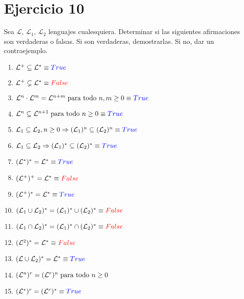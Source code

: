 \documentclass[12pt]{article}
\begin{document}
\section*{Ejercicio 10}
Sea $\mathcal{L}$, $\mathcal{L}_1$, $\mathcal{L}_2$ lenguajes cualesquiera. Determinar si las siguientes afirmaciones son verdaderas o falsas. Si son verdaderas, demostrarlas. Si no, dar un contraejemplo.
\begin{enumerate}[label=\Roman*.]
    \item $\mathcal{L}^+ \subseteq \mathcal{L}^* \equiv \textcolor{blue}{True}$
    \item $\mathcal{L}^+ \subsetneq \mathcal{L}^* \equiv \textcolor{red}{False}$
    \item $\mathcal{L}^n \cdot \mathcal{L}^m = \mathcal{L}^{n+m} \hspace{0.1cm} \text{para todo } n,m \geq 0 \equiv \textcolor{blue}{True}$
    \item $\mathcal{L}^n \subseteq \mathcal{L}^{n+1} \hspace{0.1cm} \text{para todo } n \geq 0\equiv \textcolor{blue}{True}$
    \item $\mathcal{L}_1 \subseteq \mathcal{L}_2, n \geq 0 \Rightarrow (\mathcal{L}_1)^n \subseteq (\mathcal{L}_2)^n \equiv \textcolor{blue}{True}$
    \item $\mathcal{L}_1 \subseteq \mathcal{L}_2 \Rightarrow (\mathcal{L}_1)^* \subseteq (\mathcal{L}_2)^* \equiv \textcolor{blue}{True}$
    \item $(\mathcal{L}^*)^* = \mathcal{L}^* \equiv \textcolor{blue}{True}$
    \item $(\mathcal{L}^+)^+ = \mathcal{L}^* \equiv \textcolor{red}{False}$
    \item $(\mathcal{L}^+)^* = \mathcal{L}^* \equiv \textcolor{blue}{True}$
    \item $(\mathcal{L}_1 \cup \mathcal{L}_2)^* = (\mathcal{L}_1)^* \cup (\mathcal{L}_2)^* \equiv \textcolor{red}{False}$
    \item $(\mathcal{L}_1 \cap \mathcal{L}_2)^* = (\mathcal{L}_1)^* \cap (\mathcal{L}_2)^* \equiv \textcolor{red}{False}$
    \item $(\mathcal{L}^2)^* = \mathcal{L}^* \equiv \textcolor{red}{False}$
    \item $(\mathcal{L} \cup \mathcal{L}_2)^* = \mathcal{L}^* \equiv \textcolor{blue}{True}$
    \item $(\mathcal{L}^n)^r = (\mathcal{L}^r)^n \hspace{0.1cm} \text{para todo } n \geq 0$
    \item $(\mathcal{L}^*)^r = (\mathcal{L}^r)^* \equiv \textcolor{blue}{True}$
\end{enumerate}
\end{document}
